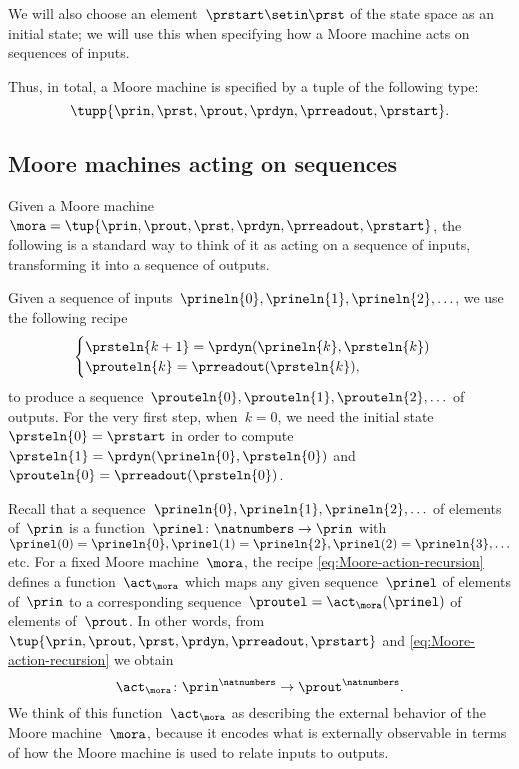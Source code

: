 We will also choose an element~$\prstart \setin \prst$ of the state space as an initial state; we will use this when specifying how a Moore machine acts on sequences of inputs.

Thus, in total, a Moore machine is specified by a tuple of the following type:
\begin{equation}
    \label{eq:moore-tuple}
    \tupp{\prin,\prst,\prout,\prdyn,\prreadout,\prstart}.
\end{equation}


\subsection{Moore machines acting on sequences}

Given a Moore machine~$\mora = \tup{\prin, \prout, \prst, \prdyn, \prreadout, \prstart}$, the following is a standard way to think of it as acting on a sequence of inputs, transforming it into a sequence of outputs.

Given a sequence of inputs~$\prineln{0}, \prineln{1}, \prineln{2}, \ldots $, we use the following recipe
\begin{equation}
    \label{eq:Moore-action-recursion}
    \begin{cases}
        \prsteln{k+1} = \prdyn(\prineln{k}, \prsteln{k}) \\
        \prouteln{k}   = \prreadout(\prsteln{k}),
    \end{cases}
\end{equation}
to produce a sequence~$\prouteln{0}, \prouteln{1}, \prouteln{2}, \ldots$ of outputs.
For the very first step, when~$k = 0$, we need the initial state~$\prsteln{0} = \prstart$ in order to compute~$\prsteln{1} = \prdyn(\prineln{0}, \prsteln{0})$ and~$\prouteln{0} = \prreadout(\prsteln{0})$.


Recall that a sequence~$\prineln{0}, \prineln{1}, \prineln{2}, \ldots$ of elements of~$\prin$ is a function~$\prinel \colon \natnumbers \to \prin$ with~$\prinel(0) = \prineln{0}, \prinel(1) = \prineln{2}, \prinel(2) = \prineln{3}, \ldots$ etc.
For a fixed Moore machine~$\mora$, the recipe \cref{eq:Moore-action-recursion} defines a function~$\act_\mora$ which maps any given sequence~$\prinel$ of elements of~$\prin$ to a corresponding sequence~$\proutel = \act_\mora(\prinel)$ of elements of~$\prout$.
In other words, from~$\tup{\prin, \prout, \prst, \prdyn, \prreadout, \prstart}$ and \cref{eq:Moore-action-recursion} we obtain
\begin{equation*}
    \act_\mora \colon \prin^\natnumbers \to \prout^\natnumbers.
\end{equation*}
We think of this function~$\act_\mora$ as describing the external behavior of the Moore machine~$\mora$, because it encodes what is externally observable in terms of how the Moore machine is used to relate inputs to outputs.

